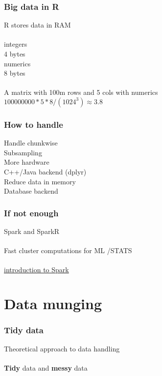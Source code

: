 \documentclass{beamer}
\begin{document}
\begin{frame}
	\frametitle{Big data in R}
	\begin{center}
		R stores data in RAM\\~\\
		integers\\
		4 bytes\\
		numerics\\
		8 bytes\\~\\
		A matrix with 100m rows and 5 cols with numerics \\
		$100000000 * 5 * 8 / (1024^3) \approx 3.8$
	\end{center}
\end{frame}

\begin{frame}
	\frametitle{How to handle}
	\begin{center}
		Handle chunkwise\\
		Subsampling\\
		More hardware\\
		C++/Java backend (dplyr)\\
		Reduce data in memory\\
		Database backend\\
	\end{center}
\end{frame}

\begin{frame}
	\frametitle{If not enough}
	\begin{center}
		Spark and SparkR\\~\\
		Fast cluster computations  for ML /STATS\\~\\
		\href{https://www.youtube.com/watch?v=_Ss1Cm6WO-I}
		{introduction to Spark}	\\
	\end{center}
\end{frame}

\section{Data munging}

\begin{frame}
	\frametitle{Tidy data}
	\begin{center}
		Theoretical approach to data handling\\~\\
		\textbf{Tidy} data and \textbf{messy} data\\~\\
	\end{center}
\end{frame}
\end{document}
